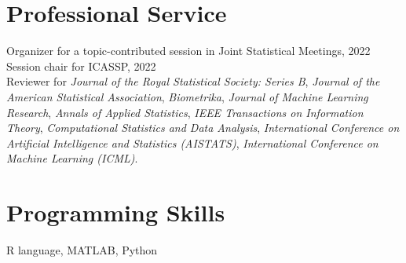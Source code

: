 \documentclass[letterpaper,11pt]{article}
\begin{document}
	\section{Professional Service}
	Organizer for a topic-contributed session in Joint Statistical Meetings, 2022\\
	Session chair for ICASSP, 2022\\
	Reviewer for {\em Journal of the Royal Statistical Society: Series B}, {\em Journal of the American Statistical Association}, {\em Biometrika}, {\em Journal of Machine Learning Research}, {\em Annals of Applied Statistics}, {\em IEEE Transactions on Information Theory}, {\em Computational Statistics and Data Analysis}, {\em International Conference on Artificial Intelligence and Statistics (AISTATS)}, {\em International Conference on Machine Learning (ICML)}.
	\section{Programming Skills}
	 R language,  MATLAB, Python
\begin{comment}
	\section{References}
\begin{tabular}{lr}
	\begin{minipage}[t]{2.5in}
		Prof.\ Genevera I. Allen\\
		Rice University\\
		Location B\\
		Country and Postcode\\
		\Telefon\ +00 1 234 5678\\
		\Letter\ \href{mailto:X@A.ac.jp}{X\textrm{@}A.ac.jp}
	\end{minipage}
	&
	\begin{minipage}[t]{2.5in}
		Prof.\ X Y\\
		Place A\\
		Location B\\
		Country and Postcode\\
		\Telefon\ +00 1 234 5678\\
		\Letter\ \href{mailto:X@A.ac.jp}{X\textrm{@}A.ac.jp}
	\end{minipage}
\end{tabular}
\end{comment}
\end{document}
